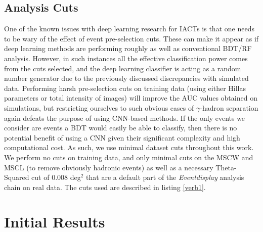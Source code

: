 \subsection{Analysis Cuts}
One of the known issues with deep learning research for IACTs is that one needs to be wary of the effect of event pre-selection cuts. These can make it appear as if deep learning methods are performing roughly as well as conventional BDT/RF analysis. However, in such instances all the effective classification power comes from the cuts selected, and the deep learning classifier is acting as a random number generator due to the previously discussed discrepancies with simulated data. Performing harsh pre-selection cuts on training data (using either Hillas parameters or total intensity of images) will improve the AUC values obtained on simulations, but restricting ourselves to such obvious cases of $\gamma$-hadron separation again defeats the purpose of using CNN-based methods. If the only events we consider are events a BDT would easily be able to classify, then there is no potential benefit of using a CNN given their significant complexity and high computational cost. As such, we use minimal dataset cuts throughout this work. We perform no cuts on training data, and only minimal cuts on the MSCW and MSCL (to remove obviously hadronic events) as well as a necessary Theta-Squared cut of 0.008 deg$^2$ that are a default part of the \textit{Eventdisplay} analysis chain on real data. The cuts used are described in listing \ref{verb1}.

\section{Initial Results}
